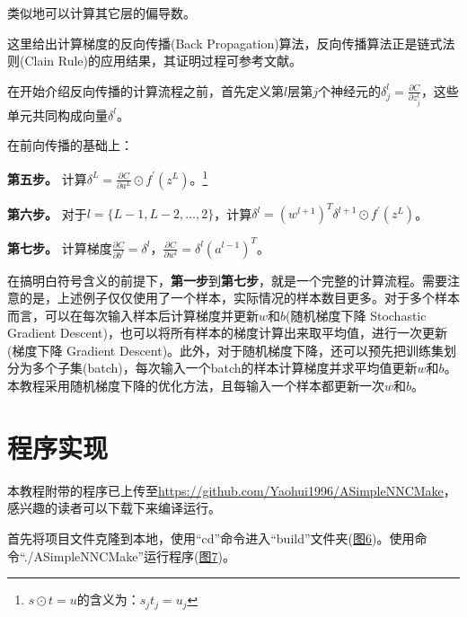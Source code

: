 \documentclass[titlepage,UTF8,zihao=-4]{ctexart}
\begin{document}
类似地可以计算其它层的偏导数。

这里给出计算梯度的反向传播(Back Propagation)算法，反向传播算法正是链式法则(Clain Rule)的应用结果，其证明过程可参考文献\cite{MN,QXP}。

在开始介绍反向传播的计算流程之前，首先定义第$l$层第$j$个神经元的$\delta_j^l=\frac{\partial C}{\partial z_j^l}$，这些单元共同构成向量$\delta^l$。

在前向传播的基础上：

\textbf{第五步。} 计算$\delta^L = \frac{\partial C}{\partial a^L} \odot f^{'}(z^L)$。\footnote{$s \odot t = u$的含义为：$s_jt_j =u_j $}

\textbf{第六步。} 对于$l = \{L-1,L-2,\dots,2\}$，计算$\delta^l = (w^{l+1})^T\delta^{l+1} \odot f^{'}(z^L) $。

\textbf{第七步。} 计算梯度$\frac{\partial C}{\partial b^l} = \delta^l$，$\frac{\partial C}{\partial w^l} = \delta^l(a^{l-1})^T  $。

在搞明白符号含义的前提下，\textbf{第一步}到\textbf{第七步}，就是一个完整的计算流程。需要注意的是，上述例子仅仅使用了一个样本，实际情况的样本数目更多。对于多个样本而言，可以在每次输入样本后计算梯度并更新$w$和$b$(随机梯度下降 Stochastic Gradient Descent)，也可以将所有样本的梯度计算出来取平均值，进行一次更新(梯度下降 Gradient Descent)。此外，对于随机梯度下降，还可以预先把训练集划分为多个子集(batch)，每次输入一个batch的样本计算梯度并求平均值更新$w$和$b$。本教程采用随机梯度下降的优化方法，且每输入一个样本都更新一次$w$和$b$。

\section{程序实现}
本教程附带的程序已上传至\url{https://github.com/Yaohui1996/ASimpleNNCMake}，感兴趣的读者可以下载下来编译运行。

首先将项目文件克隆到本地，使用“cd”命令进入“build”文件夹(\hyperref[step1]{图6})。使用命令“./ASimpleNNCMake”运行程序(\hyperref[step2]{图7})。
\end{document}
